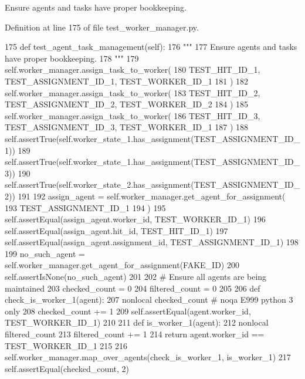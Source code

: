 \begin{DoxyVerb}Ensure agents and tasks have proper bookkeeping.
\end{DoxyVerb}
 

Definition at line 175 of file test\+\_\+worker\+\_\+manager.\+py.


\begin{DoxyCode}
175     \textcolor{keyword}{def }test\_agent\_task\_management(self):
176         \textcolor{stringliteral}{"""}
177 \textcolor{stringliteral}{        Ensure agents and tasks have proper bookkeeping.}
178 \textcolor{stringliteral}{        """}
179         self.worker\_manager.assign\_task\_to\_worker(
180             TEST\_HIT\_ID\_1, TEST\_ASSIGNMENT\_ID\_1, TEST\_WORKER\_ID\_1
181         )
182         self.worker\_manager.assign\_task\_to\_worker(
183             TEST\_HIT\_ID\_2, TEST\_ASSIGNMENT\_ID\_2, TEST\_WORKER\_ID\_2
184         )
185         self.worker\_manager.assign\_task\_to\_worker(
186             TEST\_HIT\_ID\_3, TEST\_ASSIGNMENT\_ID\_3, TEST\_WORKER\_ID\_1
187         )
188         self.assertTrue(self.worker\_state\_1.has\_assignment(TEST\_ASSIGNMENT\_ID\_1))
189         self.assertTrue(self.worker\_state\_1.has\_assignment(TEST\_ASSIGNMENT\_ID\_3))
190         self.assertTrue(self.worker\_state\_2.has\_assignment(TEST\_ASSIGNMENT\_ID\_2))
191 
192         assign\_agent = self.worker\_manager.get\_agent\_for\_assignment(
193             TEST\_ASSIGNMENT\_ID\_1
194         )
195         self.assertEqual(assign\_agent.worker\_id, TEST\_WORKER\_ID\_1)
196         self.assertEqual(assign\_agent.hit\_id, TEST\_HIT\_ID\_1)
197         self.assertEqual(assign\_agent.assignment\_id, TEST\_ASSIGNMENT\_ID\_1)
198 
199         no\_such\_agent = self.worker\_manager.get\_agent\_for\_assignment(FAKE\_ID)
200         self.assertIsNone(no\_such\_agent)
201 
202         \textcolor{comment}{# Ensure all agents are being maintained}
203         checked\_count = 0
204         filtered\_count = 0
205 
206         \textcolor{keyword}{def }check\_is\_worker\_1(agent):
207             nonlocal checked\_count  \textcolor{comment}{# noqa E999 python 3 only}
208             checked\_count += 1
209             self.assertEqual(agent.worker\_id, TEST\_WORKER\_ID\_1)
210 
211         \textcolor{keyword}{def }is\_worker\_1(agent):
212             nonlocal filtered\_count
213             filtered\_count += 1
214             \textcolor{keywordflow}{return} agent.worker\_id == TEST\_WORKER\_ID\_1
215 
216         self.worker\_manager.map\_over\_agents(check\_is\_worker\_1, is\_worker\_1)
217         self.assertEqual(checked\_count, 2)

\end{DoxyCode}
